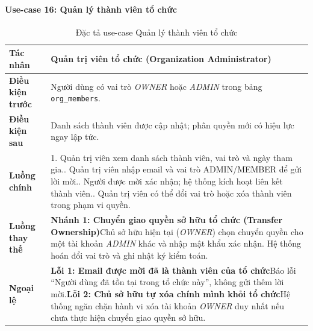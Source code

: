 
\paragraph{Use-case 16: Quản lý thành viên tổ chức}

\begingroup
\small
\begin{longtable}{|p{3.2cm}|p{\dimexpr\linewidth-3.2cm-4\tabcolsep-3\arrayrulewidth\relax}|}
\caption{Đặc tả use-case Quản lý thành viên tổ chức}
\label{aihub:tab:uc_manage_org_members}\\
\hline
\textbf{Tác nhân} & Quản trị viên tổ chức (Organization Administrator) \\ \hline
\textbf{Điều kiện trước} & Người dùng có vai trò \textit{OWNER} hoặc \textit{ADMIN} trong bảng \texttt{org\_members}. \\ \hline
\textbf{Điều kiện sau} & Danh sách thành viên được cập nhật; phân quyền mới có hiệu lực ngay lập tức. \\ \hline
\textbf{Luồng chính} & 1. Quản trị viên xem danh sách thành viên, vai trò và ngày tham gia.\newline 2. Quản trị viên nhập email và vai trò ADMIN/MEMBER để gửi lời mời.\newline 3. Người được mời xác nhận; hệ thống kích hoạt liên kết thành viên.\newline 4. Quản trị viên có thể đổi vai trò hoặc xóa thành viên trong phạm vi quyền. \\ \hline
\textbf{Luồng thay thế} &
\textbf{Nhánh 1: Chuyển giao quyền sở hữu tổ chức (Transfer Ownership)}\newline Chủ sở hữu hiện tại (\textit{OWNER}) chọn chuyển quyền cho một tài khoản \textit{ADMIN} khác và nhập mật khẩu xác nhận. Hệ thống hoán đổi vai trò và ghi nhật ký kiểm toán. \\ \hline
\textbf{Ngoại lệ} &
\textbf{Lỗi 1: Email được mời đã là thành viên của tổ chức}\newline Báo lỗi ``Người dùng đã tồn tại trong tổ chức này'', không gửi thêm lời mời.\newline \textbf{Lỗi 2: Chủ sở hữu tự xóa chính mình khỏi tổ chức}\newline Hệ thống ngăn chặn hành vi xóa tài khoản \textit{OWNER} duy nhất nếu chưa thực hiện chuyển giao quyền sở hữu. \\ \hline
\end{longtable}
\endgroup

